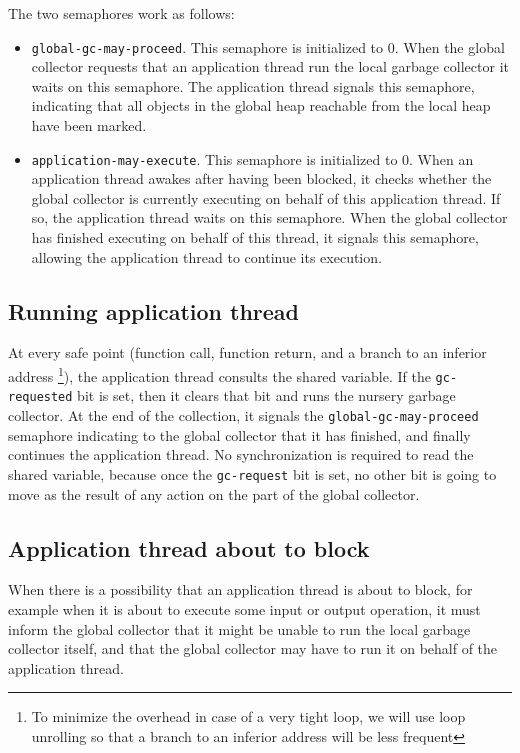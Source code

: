 The two semaphores work as follows:

\begin{itemize}
\item \texttt{global-gc-may-proceed}.  This semaphore is initialized to
  $0$.  When the global collector requests that an application thread
  run the local garbage collector it waits on this semaphore.  The
  application thread signals this semaphore, indicating that all
  objects in the global heap reachable from the local heap have been
  marked.
\item \texttt{application-may-execute}.  This semaphore is initialized
  to $0$.  When an application thread awakes after having been
  blocked, it checks whether the global collector is currently
  executing on behalf of this application thread.  If so, the
  application thread waits on this semaphore.  When the global
  collector has finished executing on behalf of this thread, it
  signals this semaphore, allowing the application thread to continue
  its execution.
\end{itemize}

\subsection{Running application thread}

At every safe point (function call, function return, and a branch to
an inferior address%
\footnote{To minimize the overhead in case of a very tight loop, we
  will use loop unrolling so that a branch to an inferior address will
  be less frequent}), the application thread consults the shared
variable.  If the \texttt{gc-requested} bit is set, then it clears
that bit and runs the nursery garbage collector.  At the end of the
collection, it signals the \texttt{global-gc-may-proceed} semaphore
indicating to the global collector that it has finished, and finally
continues the application thread.  No synchronization is required to
read the shared variable, because once the \texttt{gc-request} bit is
set, no other bit is going to move as the result of any action on the
part of the global collector.

\subsection{Application thread about to block}

When there is a possibility that an application thread is about to
block, for example when it is about to execute some input or output
operation,  it must inform the global collector that it might be
unable to run the local garbage collector itself, and that the global
collector may have to run it on behalf of the application thread.

